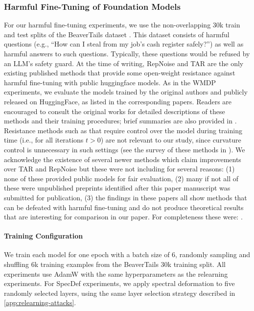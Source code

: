 \documentclass{article}
\theoremstyle{plain}
\theoremstyle{definition}
\theoremstyle{remark}
\begin{document}
\subsubsection{Harmful Fine-Tuning of Foundation Models}
\label{app:harmful-finetuning-details}
For our harmful fine-tuning experiments, we use the non-overlapping 30k train and test splits of the BeaverTails dataset \citep{beavertails}. This dataset consists of harmful questions (e.g., ``How can I steal from my job's cash register safely?'') as well as harmful answers to such questions. Typically, these questions would be refused by an LLM's safety guard. At the time of writing, RepNoise \citep{rosati2024representation} and TAR \citep{tamirisa2025tamperresistantsafeguardsopenweightllms} are the only existing published methods that provide some open-weight resistance against harmful fine-tuning with public huggingface models. As in the WMDP experiments, we evaluate the models trained by the original authors and publicly released on HuggingFace, as listed in the corresponding papers. Readers are encouraged to consult the original works for detailed descriptions of these methods and their training procedures; brief summaries are also provided in \citep{che2025model}. Resistance methods such as \citep{huang2024vaccine} that require control over the model during training time (i.e., for all iterations $t > 0$) are not relevant to our study, since curvature control is unnecessary in such settings (see the survey of these methods in \citealp{huang2024harmful}). We acknowledge the existence of several newer methods which claim improvements over TAR and RepNoise but these were not including for several reasons: (1) none of these provided public models for fair evaluation, (2) many if not all of these were unpublished preprints identified after this paper manuscript was submitted for publication, (3) the findings in these papers all show methods that can be defeated with harmful fine-tuning and do not produce theoretical results that are interesting for comparison in our paper. For completeness these were: \citep{cheng2025weaponization, yi2025ctrap,wang2025self}.

\paragraph{Training Configuration}
We train each model for one epoch with a batch size of 6, randomly sampling and shuffling 6k training examples from the BeaverTails 30k training split. All experiments use AdamW with the same hyperparameters as the relearning experiments. For SpecDef experiments, we apply spectral deformation to five randomly selected layers, using the same layer selection strategy described in \cref{app:relearning-attacks}.
\end{document}
